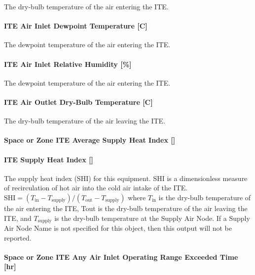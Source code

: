 The dry-bulb temperature of the air entering the ITE.

\paragraph{ITE Air Inlet Dewpoint Temperature {[}C{]}}\label{ite-air-inlet-dewpoint-temperature-c}

The dewpoint temperature of the air entering the ITE.

\paragraph{ITE Air Inlet Relative Humidity {[}\%{]}}\label{ite-air-inlet-relative-humidity}

The dewpoint temperature of the air entering the ITE.

\paragraph{ITE Air Outlet Dry-Bulb Temperature {[}C{]}}\label{ite-air-outlet-dry-bulb-temperature-c}

The dry-bulb temperature of the air leaving the ITE.

\paragraph{Space or Zone ITE Average Supply Heat Index {[]}}\label{zone-ite-average-supply-heat-index}

\paragraph{ITE Supply Heat Index {[]}}\label{ite-supply-heat-index}

The supply heat index (SHI) for this equipment. SHI is a dimensionless measure of recirculation of hot air into the cold air intake of the ITE. $\textrm{SHI} = (T_{\textrm{in}} - T_{\textrm{supply}})/(T_{\textrm{out}}-T_{\textrm{supply}})$ where $T_{\textrm{in}}$ is the dry-bulb temperature of the air entering the ITE, Tout is the dry-bulb temperature of the air leaving the ITE, and $T_{\textrm{supply}}$ is the dry-bulb temperature at the Supply Air Node. If a Supply Air Node Name is not specified for this object, then this output will not be reported.

\paragraph{Space or Zone ITE Any Air Inlet Operating Range Exceeded Time {[}hr{]}}\label{zone-ite-any-air-inlet-operating-range-exceeded-time-hr}

